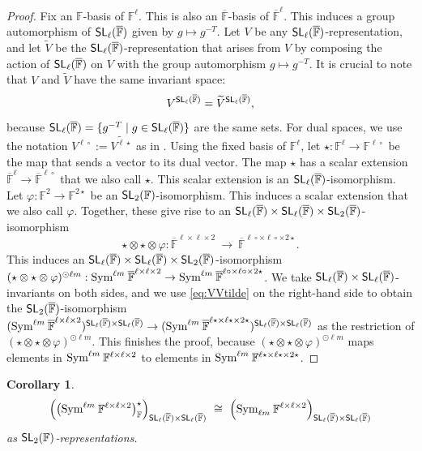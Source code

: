 \documentclass[a4paper]{extarticle}
\newcommand{\IF}{\mathbb{F}}
\newcommand{\oIF}{{\overline{\mathbb{F}}}}
\newcommand{\SL}{\textsf{\textup{SL}}}
\newcommand{\Sym}{\textup{Sym}}
\numberwithin{theorem}{section}
\newtheorem{corollary}[theorem]{Corollary}
\theoremstyle{definition}
\begin{document}
\begin{proof}
Fix an $\IF$-basis of $\IF^{\ell}$.
This is also an $\oIF$-basis of $\oIF^{\ell}$.
This induces a group automorphism of $\SL_\ell(\oIF)$ given by $g \mapsto g^{-T}$.
Let $V$ be any $\SL_\ell(\oIF)$-representation, and let $\widetilde V$ be the $\SL_\ell(\oIF)$-representation that arises from $V$ by composing the action of $\SL_\ell(\oIF)$ on $V$ with the group automorphism $g\mapsto g^{-T}$. It is crucial to note that $V$ and $\widetilde V$ have the same invariant space:
\begin{equation}\label{eq:VVtilde}
V^{\SL_\ell(\oIF)} = \widetilde V^{\SL_\ell(\oIF)},
\end{equation}
because $\SL_\ell(\oIF) = \{g^{-T}\mid g \in \SL_\ell(\oIF)\}$ are the same sets.
For dual spaces, we use the notation $V^{\ell\circ} := \widetilde{V^{\ell\star}}$ as in \cite[\S2.8]{MW:22}.
Using the fixed basis of $\IF^\ell$, let $\star:\IF^{\ell}\to\IF^{\ell\circ}$ be the map that sends a vector to its dual vector.
The map $\star$ has a scalar extension $\oIF^{\ell}\to\oIF^{\ell\circ}$ that we also call $\star$.
This scalar extension is an $\SL_\ell(\oIF)$-isomorphism.
Let $\varphi:\IF^2\to\IF^{2\star}$ be an $\SL_2(\IF)$-isomorphism.
This induces a scalar extension that we also call $\varphi$.
Together, these give rise to an $\SL_\ell(\oIF)\times \SL_\ell(\oIF)\times \SL_2(\oIF)$-isomorphism
\[
\star\otimes\star\otimes\varphi : \oIF^{\ell\times\ell\times 2}
 \ \to \ 
\oIF^{\ell\circ\times\ell\circ\times 2\star}.
\]
This induces an $\SL_\ell(\oIF)\times \SL_\ell(\oIF)\times \SL_2(\oIF)$-isomorphism $(\star\otimes\star\otimes\varphi)^{\odot\ell m} : \Sym^{\ell m}\:\oIF^{\ell\times\ell\times2}
\to
\Sym^{\ell m}\:\oIF^{\ell\circ\times\ell\circ\times 2\star}$.
We take $\SL_\ell(\oIF)\times \SL_\ell(\oIF)$-invariants on both sides, and we use \eqref{eq:VVtilde} on the right-hand side to obtain the $\SL_2(\oIF)$-isomorphism
$(\Sym^{\ell m}\:\oIF^{\ell\times\ell\times2})^{\SL_\ell(\oIF)\times\SL_\ell(\oIF)}
\to
(\Sym^{\ell m}\:\oIF^{\ell\star\times\ell\star\times 2\star})^{\SL_\ell(\oIF)\times\SL_\ell(\oIF)}$
as the restriction of $(\star\otimes\star\otimes\varphi)^{\odot\ell m}$.
This finishes the proof, because $(\star\otimes\star\otimes\varphi)^{\odot\ell m}$
maps elements in
$\Sym^{\ell m}\:\IF^{\ell\times\ell\times2}$
to elements in 
$\Sym^{\ell m}\:\IF^{\ell\star\times\ell\star\times 2\star}$.
\end{proof}
\begin{corollary}
\label{cor:innerdual}
\[
\Big(\big(\Sym^{\ell m} \:\IF^{\ell \times\ell \times 2}\big)^\star_\IF\Big)_{\SL_\ell(\oIF)\times \SL_\ell(\oIF)} \ \cong  \ \Big(\Sym_{\ell m} \:\IF^{\ell \times\ell \times 2}\Big)_{\SL_\ell(\oIF)\times \SL_\ell(\oIF)}
\]
as $\SL_2(\IF)$-representations.
\end{corollary}
\end{document}
